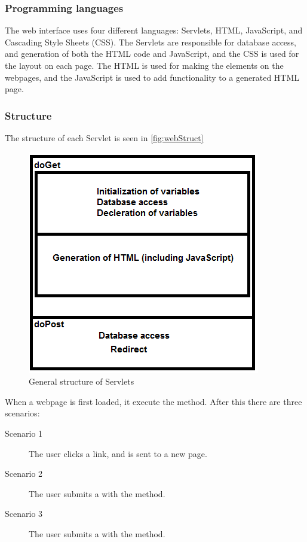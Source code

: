 \subsubsection{Programming languages}
The web interface uses four different languages: Servlets, HTML, JavaScript, and Cascading Style Sheets (CSS). The Servlets are responsible for database access, and generation of both the HTML code and JavaScript, and the CSS is used for the layout on each page. The HTML is used for making the elements on the webpages, and the JavaScript is used to add functionality to a generated HTML page.

\subsubsection{Structure}
The structure of each Servlet is seen in \autoref{fig:webStruct}
\begin{figure}
	\centering
		\includegraphics{images/webStruct.png}
	\caption{General structure of Servlets}
	\label{fig:webStruct}
\end{figure}

When a webpage is first loaded, it execute the  method. After this there are three scenarios:
\begin{description}
	\item[Scenario 1] The user clicks a link, and is sent to a new page.
	\item[Scenario 2] The user submits a  with the  method. 
	\item[Scenario 3] The user submits a  with the  method.
\end{description}

